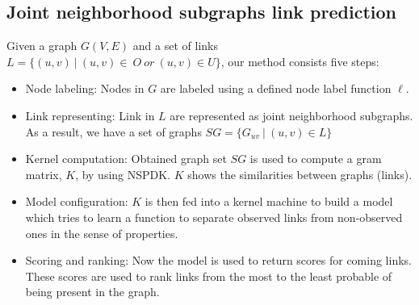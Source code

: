 \documentclass[runningheads,a4paper]{llncs}
\begin{document}
\subsection{Joint neighborhood subgraphs link prediction}
Given a graph $G(V,E)$ and a set of links $L = \lbrace(u,v)\ |\ (u,v)\in\ O\ or\ (u,v)\in U \rbrace$, our method consists five steps:
\begin{itemize}
	\item Node labeling: Nodes in $G$ are labeled using a defined node label function $\ell$.
	\item Link representing: Link in $L$ are represented as joint neighborhood subgraphs. As a result, we have a set of graphs $SG = \lbrace G_{uv}\ |\ (u,v) \in L \rbrace$
	\item Kernel computation: Obtained graph set $SG$ is used to compute a gram matrix, $K$, by using NSPDK. $K$ shows the similarities between graphs (links).
	\item Model configuration: $K$ is then fed into a kernel machine to build a model which tries to learn a function to separate observed links from non-observed ones in the sense of properties.
	\item Scoring and ranking: Now the model is used to return scores for coming links. These scores are used to rank links from the most to the least probable of being present in the graph.
\end{itemize}
\end{document}
